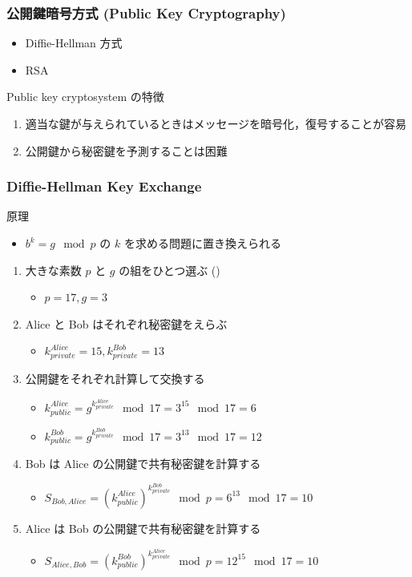 \begin{frame}
\frametitle{公開鍵暗号方式 (Public Key Cryptography)}
  \begin{itemize}
\item Diffie-Hellman 方式
\item RSA
  \end{itemize}
  \begin{block}{Public key cryptosystem の特徴}
    \begin{enumerate}
\item 適当な鍵が与えられているときはメッセージを暗号化，復号することが容易
\item 公開鍵から秘密鍵を予測することは困難\label{num:infeasible}
    \end{enumerate}
  \end{block}
\end{frame}
\begin{frame}[shrink]
\frametitle{Diffie-Hellman Key Exchange}
  \begin{block}{原理}
    \begin{itemize}
\item \(b^k=g \mod p\) の $k$ を求める問題に置き換えられる
    \end{itemize}
  \end{block}
  \begin{enumerate}
\item 大きな素数 $p$ と $g$ の組をひとつ選ぶ (\href{https://www.ietf.org/rfc/rfc3526.txt}{})
    \begin{itemize}
\item \(p=17, g=3\)
    \end{itemize}
\item Alice と Bob はそれぞれ秘密鍵をえらぶ
    \begin{itemize}
\item \(k_{private}^{Alice}=15, k_{private}^{Bob}=13\)
    \end{itemize}
\item 公開鍵をそれぞれ計算して交換する\label{num:publickey}
    \begin{itemize}
\item \(k_{public}^{Alice}=g^{k_{private}^{Alice}}\mod 17=3^{15}\mod 17=6\)
\item \(k_{public}^{Bob}=g^{k_{private}^{Bob}}\mod 17=3^{13}\mod 17=12\)
    \end{itemize}
\item Bob は Alice の公開鍵で共有秘密鍵を計算する
    \begin{itemize}
\item \(S_{Bob,Alice}=(k_{public}^{Alice})^{k_{private}^{Bob}}\mod p=6^{13}\mod 17=10\)
    \end{itemize}
\item Alice は Bob の公開鍵で共有秘密鍵を計算する
    \begin{itemize}
\item \(S_{Alice,Bob}=(k_{public}^{Bob})^{k_{private}^{Alice}}\mod p=12^{15}\mod 17=10\)
    \end{itemize}
  \end{enumerate}
\end{frame}
